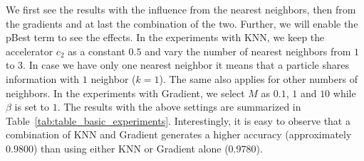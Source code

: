 \documentclass{ieeeaccess}
\begin{document}
We first see the results with the influence from the nearest neighbors, then from the gradients and at last the combination of the two. Further, we will enable the pBest term to see the effects.  In the experiments with KNN, we keep the accelerator $c_2$ as a constant $0.5$ and vary the number of nearest neighbors from $1$ to $3$. In case we have only one nearest neighbor it means that a particle shares information with $1$ neighbor ($k=1$). The same also applies for other numbers of neighbors. In the experiments with Gradient, we select $M$ as $0.1$, $1$ and $10$ while $\beta$ is set to $1$. 
The results with the above settings are summarized in Table~\ref{tab:table_basic_experiments}. Interestingly, it is easy to observe that a combination of KNN and Gradient generates a higher accuracy (approximately $0.9800$) than using either KNN or Gradient alone ($0.9780$).
\end{document}

